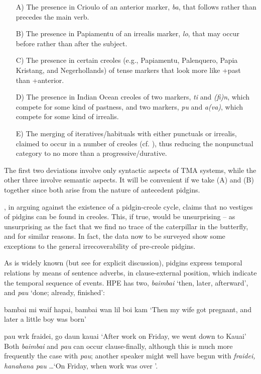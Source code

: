 \begin{itemize}\label{majordeviations}
\item[A)] The presence in Crioulo of an anterior marker, \textit{ba}, that follows rather than precedes the main verb.
\item[B)] The presence in Papiamentu of an irrealis marker, \textit{lo}, that may occur before rather than after the subject.
\item[C)] The presence in certain creoles (e.g., Papiamentu, Palenquero, Papia Kristang, and Negerhollands) of tense markers that look more like +past than +anterior.
\item[D)] The presence in Indian Ocean creoles of two markers, \textit{ti} and \textit{(fi)n}, which compete for some kind of pastness, and two markers, \textit{pu} and \textit{a(va)}, which compete for some kind of irrealis.
\item[E)] The merging of iteratives/habituals with either punctuals or irrealis, claimed to occur in a number of creoles (cf. \citealt{Taylor1971}), thus reducing the nonpunctual category to no more than a progressive/durative.
\end{itemize}

The first two deviations involve only syntactic aspects of TMA systems, while the other three involve semantic aspects. It will be convenient if we take (A) and (B) together since both arise from the nature of antecedent pidgins.

\citet{Alleyne1979}, in arguing against the existence of a pidgin-creole cycle, claims that no vestiges of pidgins can be found in creoles. This, if true, would be unsurprising -- as unsurprising as the fact that we find no trace of the caterpillar in the butterfly, and for similar reasons. In fact, the data now to be surveyed show some exceptions to the general irrecoverability of pre-creole pidgins.

As is widely known (but see \citet{Labov1971} for explicit discussion), pidgins express temporal relations by means of sentence adverbs, in clause-external position, which indicate the temporal sequence of events. HPE has two, \textit{baimbai} `then, later, afterward', and \textit{pau} `done; already, finished':

\ea\label{ex:2:92}
 {bambai} {mi} {waif} {hapai,} {bambai} {wan} {lil} {boi} {kam}
\glt `Then my wife got pregnant, and later a little boy was born'
\z

\ea\label{ex:2:93}
pau wrk fraidei, go daun kauai
\glt `After work on Friday, we went down to Kauai'
\z
Both \textit{baimbai }and \textit{pau }can occur clause-finally, although this is much more frequently the case with \textit{pau}; another speaker might well have begun  with \textit{fraidei, hanahana pau} \ldots\xspace `On Friday, when work was over \textellipsis'.

